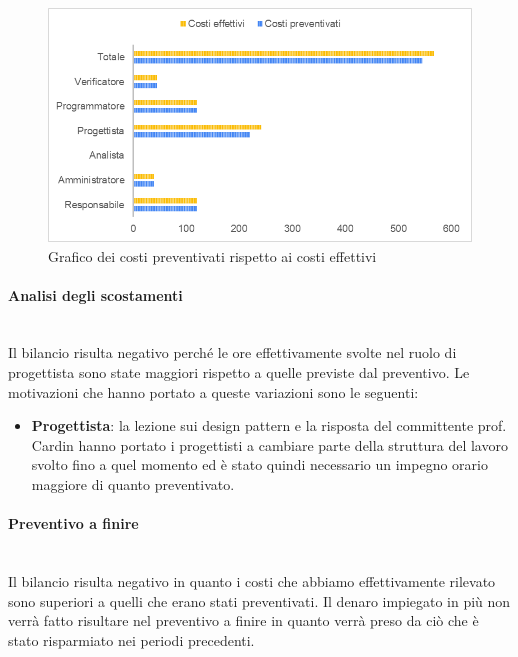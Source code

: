 \begin{figure} [H]
	\includegraphics[width=\linewidth]{./img/Grafici/38.png}
	\caption{Grafico dei costi preventivati rispetto ai costi effettivi}
\end{figure}

\paragraph*{Analisi degli scostamenti} \mbox{} \\
Il bilancio risulta negativo perché le ore effettivamente svolte nel ruolo di progettista sono state maggiori rispetto a quelle previste dal preventivo.
Le motivazioni che hanno portato a queste variazioni sono le seguenti:
\begin{itemize}
	\item \textbf{Progettista}: la lezione sui design pattern e la risposta del committente prof. Cardin hanno portato i progettisti a cambiare parte della struttura del lavoro svolto fino a quel momento ed è stato quindi necessario un impegno orario maggiore di quanto preventivato.
\end{itemize}

\paragraph*{Preventivo a finire} \mbox{} \\
Il bilancio risulta negativo in quanto i costi che abbiamo effettivamente rilevato sono superiori a quelli che erano stati preventivati. Il denaro impiegato in più non verrà fatto risultare nel preventivo a finire in quanto verrà preso da ciò che è stato risparmiato nei periodi precedenti.


